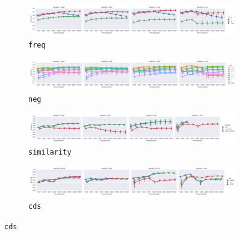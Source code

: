 \begin{figure}
  \centering

  \begin{subfigure}[t]{\textwidth}
    \includegraphics[width=1.1\textwidth]{supplement/figures/universal-interaction-freq}

  \caption{\texttt{freq}}
  \label{fig:universal-freq}
  \end{subfigure}

  \begin{subfigure}[t]{\textwidth}
    \includegraphics[width=1.1\textwidth]{supplement/figures/universal-interaction-neg}

  \caption{\texttt{neg}}
  \label{fig:universal-neg}
  \end{subfigure}

  \begin{subfigure}[t]{\textwidth}
  \includegraphics[width=1.1\textwidth]{supplement/figures/universal-interaction-similarity}

  \caption{\texttt{similarity}}
  \label{fig:universal-similarity}
  \end{subfigure}

  \begin{subfigure}[t]{\textwidth}
    \includegraphics[width=1.1\textwidth]{supplement/figures/universal-interaction-cds}

  \caption{\texttt{cds}}
  \label{fig:universal-cds}
  \end{subfigure}


\end{figure}
